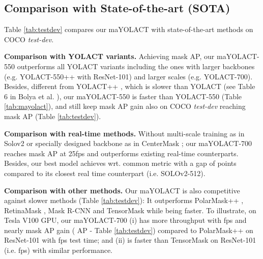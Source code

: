 \documentclass{bmvc2k}
\begin{document}
\subsection{Comparison with State-of-the-art (SOTA)}
Table \ref{tab:testdev} compares our maYOLACT with state-of-the-art methods on COCO \textit{test-dev}.

\noindent \textbf{Comparison with YOLACT variants.} Achieving  mask AP, our maYOLACT-550 outperforms all YOLACT variants including the ones with larger backbones (e.g. YOLACT-550++ with ResNet-101) and larger scales (e.g. YOLACT-700). Besides, different from YOLACT++ \cite{yolact-plus}, which is  slower than YOLACT (see Table 6 in Bolya et al. \cite{yolact-plus}), our maYOLACT-550 is faster than YOLACT-550 (Table \ref{tab:mayolact}), and still keep  mask AP gain also on COCO \textit{test-dev} reaching  mask AP (Table \ref{tab:testdev}).

\noindent \textbf{Comparison with real-time methods.} Without multi-scale training as in Solov2 \cite{solov2} or specially designed backbone as in CenterMask \cite{centermask}; our maYOLACT-700 reaches  mask AP at 25fps and outperforms existing real-time counterparts. Besides, our best model achieves  wrt. common  metric with a gap of   points compared to its closest real time counterpart (i.e. SOLOv2-512).  

\noindent \textbf{Comparison with other methods.} Our maYOLACT is also competitive against slower methods (Table \ref{tab:testdev}): It outperforms PolarMask++ \cite{PolarMask-plus}, RetinaMask \cite{retinamask}, Mask R-CNN \cite{MaskRCNN} and TensorMask \cite{tensormask} while being faster. To illustrate, on Tesla V100 GPU, our maYOLACT-700 (i) has  more throughput with fps and nearly  mask AP gain ( AP - Table \ref{tab:testdev}) compared to PolarMask++ on ResNet-101 with  fps test time;  and (ii) is  faster than TensorMask on ResNet-101 (i.e. fps) with similar performance.
\end{document}
